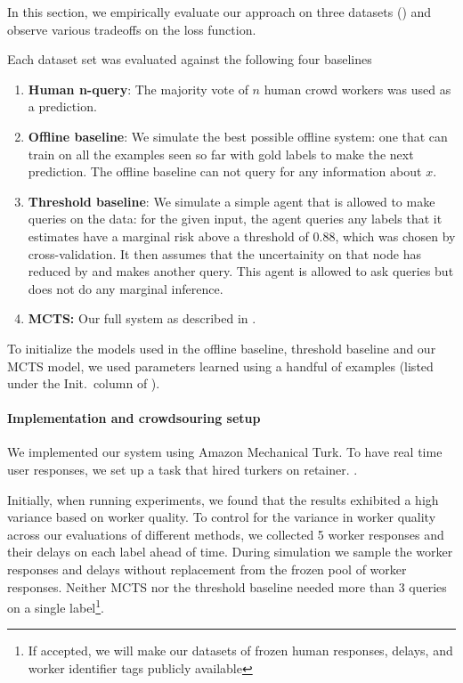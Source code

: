 In this section, we empirically evaluate our approach on three datasets () and observe various tradeoffs on the loss function.

Each dataset set was evaluated against the following four baselines
\begin{enumerate}
  \item {\bf Human n-query}: The majority vote of $n$ human crowd workers was used as a prediction.
  \item {\bf Offline baseline}: We simulate the best possible offline system: one that can train on all the examples seen so far with gold labels to make the next prediction. The offline baseline can not query for any information about $x$.
  \item {\bf Threshold baseline}: We simulate a simple agent that is allowed to make queries on the data: for the given input, the agent queries any labels that it estimates have a marginal risk above a threshold of $0.88$, which was chosen by cross-validation. It then assumes that the uncertainity on that node has reduced by \todo{} and makes another query. This agent is allowed to ask queries but does not do any marginal inference.
  \item {\bf MCTS:} Our full system as described in .
\end{enumerate}

To initialize the models used in the offline baseline, threshold baseline and our MCTS model, we used parameters learned using a handful of examples (listed under the Init.\ column of ). 

\paragraph{Implementation and crowdsouring setup}

We implemented our system using Amazon Mechanical Turk.
To have real time user responses, we set up a task that hired turkers on retainer. .

Initially, when running experiments, we found that the results exhibited a high variance based on worker quality.
To control for the variance in worker quality across our evaluations of different methods, we collected 5 worker responses and their delays on each label ahead of time.
During simulation we sample the worker responses and delays without replacement from the frozen pool of worker responses. 
Neither MCTS nor the threshold baseline needed more than 3 queries on a single label\footnote{If accepted, we will make our datasets of frozen human responses, delays, and worker identifier tags publicly available}.


